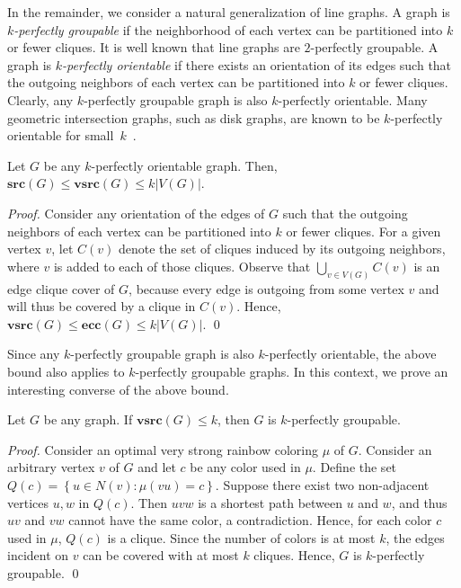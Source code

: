 \documentclass[letter,runningheads,envcountsame,envcountsect]{llncs}
\newcommand{\vsrc}{\mathbf{vsrc}}
\newcommand{\src}{\mathbf{src}}
\newcommand{\ecc}{\mathbf{ecc}}
\begin{document}
In the remainder, we consider a natural generalization of line graphs. A graph is \emph{$k$-perfectly groupable} if the neighborhood of each vertex can be partitioned into $k$ or fewer cliques. It is well known that line graphs are $2$-perfectly groupable. A graph is \emph{$k$-perfectly orientable} if there exists an orientation of its edges such that the outgoing neighbors of each vertex can be partitioned into $k$ or fewer cliques. Clearly, any $k$-perfectly groupable graph is also $k$-perfectly orientable. Many geometric intersection graphs, such as disk graphs, are known to be $k$-perfectly orientable for small~$k$~\cite{kammer}.

\begin{corollary} \label{cor:orientable}
Let $G$ be any $k$-perfectly orientable graph. Then, $\src(G) \leq \vsrc(G) \leq k |V(G)|$.
\end{corollary}
\begin{proof}
Consider any orientation of the edges of $G$ such that the outgoing neighbors of each vertex can be partitioned into $k$ or fewer cliques. For a given vertex $v$, let $C(v)$ denote the set of cliques induced by its outgoing neighbors, where $v$ is added to each of those cliques. Observe that $\bigcup_{v\in V(G)}C(v)$ is an edge clique cover of $G$, because every edge is outgoing from some vertex $v$ and will thus be covered by a clique in $C(v)$. Hence, $\vsrc(G) \leq \ecc(G) \leq k |V(G)|$.
\qed\end{proof}

Since any $k$-perfectly groupable graph is also $k$-perfectly orientable, the above bound also applies to $k$-perfectly groupable graphs. In this context, we prove an interesting converse of the above bound.

\begin{lemma} \label{lem:groupable}
Let $G$ be any graph. If $\vsrc(G) \leq k$, then $G$ is $k$-perfectly groupable.
\end{lemma}
\begin{proof}
Consider an optimal very strong rainbow coloring $\mu$ of $G$. Consider an arbitrary vertex $v$ of $G$ and let $c$ be any color used in $\mu$. Define the set $Q(c)=\left\{ u\in N(v): \mu(vu)=c \right\}$. Suppose there exist two non-adjacent vertices $u,w$ in $Q(c)$. Then $uvw$ is a shortest path between $u$ and $w$, and thus $uv$ and $vw$ cannot have the same color, a contradiction. Hence, for each color $c$ used in $\mu$, $Q(c)$ is a clique. Since the number of colors is at most $k$, the edges incident on $v$ can be covered with at most $k$ cliques. Hence, $G$ is $k$-perfectly groupable.
\qed\end{proof}
\end{document}
